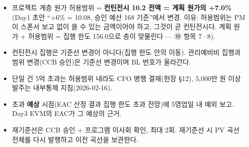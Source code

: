 \documentclass[10pt,a4paper]{article}
\begin{document}
\begin{fieldbox}
\ifwbblank
{}\par\vspace{4mm}
\par\vspace{4mm}
\par\vspace{4mm}
\par\vspace{4mm}
\par
\else
\begin{itemize}
\item 프로젝트 계층 원가 허용범위 = \textbf{컨틴전시 10.2 전액 = 계획 원가의 +7.0\%} (Day1 초안 “+6\% = 10.08, 승인 예산 168 기준”에서 변경. 이유: 허용범위는 PM이 스폰서 보고 없이 쓸 수 있는 금액이어야 하고, 그것이 곧 컨틴전시다. 계획 원가 + 허용범위 = 집행 한도 156.0으로 층이 맞물린다 — ⑩ 항목 7·8).
\item 컨틴전시 집행은 기준선 변경이 아니다(집행 한도 안의 이동). 관리예비비 집행과 범위 변경(CCB 승인)은 기준선 변경이며 BL 번호가 올라간다.
\item 단일 건 5억 초과는 허용범위 내라도 CFO 병행 결재(헌장 §12), 5,000만 원 이상 발주는 내부통제 지침(2026-02-16).
\item 초과 \textbf{예상} 시점(EAC 산정 결과 집행 한도 초과 전망)에 5영업일 내 예외 보고. Day3 EVM의 EAC가 그 예상의 근거.
\item 재기준선은 CCB 승인 + 프로그램 이사회 확인, 최대 2회. 재기준선 시 PV 곡선 전체를 다시 발행하고 이전 곡선을 보관한다.
\end{itemize}\fi
\end{fieldbox}
\end{document}
